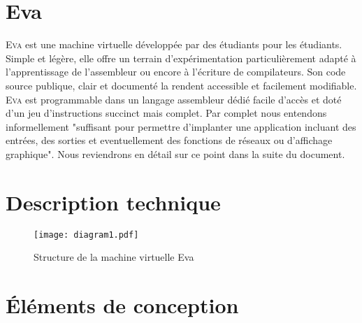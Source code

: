 \documentclass[11pt,twoside,french]{article}
\newcommand{\noun}[1]{\textsc{#1}}
\begin{document}
\vfill{}
\newpage{}

\section{Eva}

\noun{Eva} est une machine virtuelle développée par des étudiants pour les
étudiants. Simple et légère, elle offre un terrain d'expérimentation
particulièrement adapté à l'apprentissage de l'assembleur ou encore
à l'écriture de compilateurs. Son code source publique, clair et documenté
la rendent accessible et facilement modifiable. \noun{Eva} est programmable
dans un langage assembleur dédié facile d'accès et doté d'un jeu d'instructions
succinct mais complet. Par complet nous entendons informellement "suffisant pour permettre d'implanter une application incluant des entrées, des sorties et eventuellement des fonctions de réseaux ou d'affichage graphique". Nous reviendrons en détail sur ce point dans la suite du document.

\vfill{}

\section{Description technique}

\begin{figure}[h!]
  \texttt{[image: diagram1.pdf]}
  \caption{\label{fig:diagram1} Structure de la machine virtuelle Eva}
\end{figure}

\vfill{}


\section{Éléments de conception}
\end{document}
